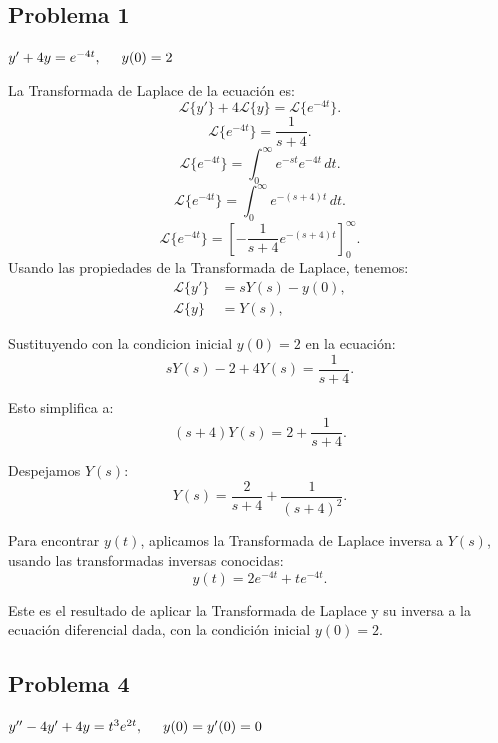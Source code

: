 \documentclass{article}
\begin{document}
\subsection*{Problema 1}
$y' + 4y = e^{-4t}, \hspace{.5cm} y(0) = 2$

La Transformada de Laplace de la ecuación es:
\begin{equation}
    \mathcal{L}\{y'\} + 4\mathcal{L}\{y\} = \mathcal{L}\{e^{-4t}\}.
\end{equation}
\[
    \mathcal{L}\{e^{-4t}\} = \frac{1}{s + 4}.
\]
\[
    \mathcal{L}\{e^{-4t}\} = \int_0^\infty e^{-st}e^{-4t}\,dt.
\]
\[
    \mathcal{L}\{e^{-4t}\} = \int_0^\infty e^{-(s+4)t}\,dt.
\]
\[
    \mathcal{L}\{e^{-4t}\} = \left[ -\frac{1}{s+4}e^{-(s+4)t} \right]_0^\infty.
\]
Usando las propiedades de la Transformada de Laplace, tenemos:
\begin{align*}
    \mathcal{L}\{y'\} & = sY(s) - y(0), \\
    \mathcal{L}\{y\}  & = Y(s),
\end{align*}

Sustituyendo con la condicion inicial \(y(0) = 2\) en la ecuación:
\begin{equation}
    sY(s) - 2 + 4Y(s) = \frac{1}{s + 4}.
\end{equation}

Esto simplifica a:
\begin{equation}
    (s + 4)Y(s) = 2 + \frac{1}{s + 4}.
\end{equation}

Despejamos \(Y(s)\):
\begin{equation}
    Y(s) = \frac{2}{s + 4} + \frac{1}{(s + 4)^2}.
\end{equation}

Para encontrar \(y(t)\), aplicamos la Transformada de Laplace inversa a \(Y(s)\), usando las transformadas inversas conocidas:
\begin{equation}
    y(t) = 2e^{-4t} + te^{-4t}.
\end{equation}

Este es el resultado de aplicar la Transformada de Laplace y su inversa a la ecuación diferencial dada, con la condición inicial \(y(0) = 2\).

\subsection*{Problema 4}
$y'' - 4y' + 4y = t^{3}e^{2t}, \hspace{.5cm} y(0) = y'(0) = 0 $
\end{document}
